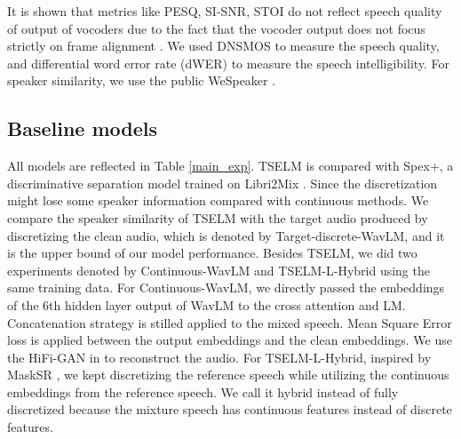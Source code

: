 \documentclass[conference]{IEEEtran}
\begin{document}
It is shown that metrics like PESQ, SI-SNR, STOI do not reflect speech quality of output of 
vocoders due to the fact that the vocoder output does not focus strictly on frame alignment
\cite{tokensplit,selm}. We used DNSMOS \cite{dnsmos} to measure the speech quality, and differential 
word error 
rate (dWER) \cite{dwer} to measure the speech intelligibility. For speaker similarity, we use the 
public WeSpeaker \cite{wespeaker}.


\subsection{Baseline models}
All models are reflected in Table \ref{main_exp}. 
TSELM is compared with Spex+, a discriminative separation model \cite{spex_plus} trained on Libri2Mix \cite{librimix}. Since the discretization might lose some 
speaker information compared with continuous methods. We compare the speaker 
similarity of TSELM with the target audio produced by discretizing the clean audio, which is denoted by Target-discrete-WavLM, and it is the upper bound of our model  
performance. Besides TSELM, we did two experiments 
denoted by Continuous-WavLM and TSELM-L-Hybrid using the same training data. 
For Continuous-WavLM, we directly
passed the embeddings of the 6th hidden layer output of WavLM to the cross attention  
and LM. Concatenation strategy is stilled applied to the mixed speech. Mean Square Error loss is applied between the output embeddings and the clean 
embeddings. We use the HiFi-GAN in \cite{knn_vc} to reconstruct the audio. For 
TSELM-L-Hybrid, inspired by MaskSR \cite{mask_sr}, we kept discretizing the reference 
speech while utilizing the continuous embeddings from the reference speech. We call 
it hybrid instead of fully discretized because the mixture speech has continuous 
features instead of discrete features. 
\end{document}
